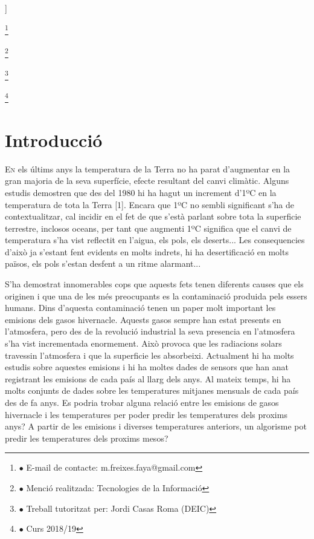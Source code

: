 \documentclass[10pt,a4paper,twocolumn,twoside]{article}
\newcommand\blfootnote[1]{%
  \begingroup
  \renewcommand\thefootnote{}\footnote{#1}%
  \addtocounter{footnote}{-1}%
  \endgroup
}
\begin{document}
\begin{@twocolumnfalse}
\begin{center}
\bigskip

{\vrule depth 0pt height 0.5pt width 4cm\hspace{7.5pt}%
%
\hspace{7.5pt}\vrule depth 0pt height 0.5pt width 4cm\relax}

\end{center}

\bigskip
\end{@twocolumnfalse}]

\blfootnote{$\bullet$ E-mail de contacte: m.freixes.faya@gmail.com}
\blfootnote{$\bullet$ Menció realitzada: Tecnologies de la Informació}
\blfootnote{$\bullet$ Treball tutoritzat per: Jordi Casas Roma (DEIC)}
\blfootnote{$\bullet$ Curs 2018/19}
\section{Introducció}
\lettrine[lines=3]{E}{n} els últims anys la temperatura de la Terra no ha parat d'augmentar en la gran majoria de la seva superfície, efecte resultant del canvi climàtic. Alguns estudis demostren que des del 1980 hi ha hagut un increment d'1ºC en la temperatura de tota la Terra [1]. Encara que 1ºC no sembli significant s'ha de contextualitzar, cal incidir en el fet de que s'està parlant sobre tota la superficie terrestre, inclosos oceans, per tant que augmenti 1ºC significa que el canvi de temperatura s'ha vist reflectit en l'aigua, els pols, els deserts... Les consequencies d'això ja s'estant fent evidents en molts indrets, hi ha desertificació en molts països, els pols s'estan desfent a un ritme alarmant... 

S'ha demostrat innomerables cops que aquests fets tenen diferents causes que els originen i que una de les més preocupants es la contaminació produida pels essers humans. Dins d'aquesta contaminació tenen un paper molt important les emisions dels gasos hivernacle. Aquests gasos sempre han estat presents en l'atmosfera, pero des de la revolució industrial la seva presencia en l'atmosfera s'ha vist incrementada enormement. Això provoca que les radiacions solars travessin l'atmosfera i que la superficie les absorbeixi. Actualment hi ha molts estudis sobre aquestes emisions i hi ha moltes dades de sensors que han anat registrant les emisions de cada país al llarg dels anys. Al mateix temps, hi ha molts conjunts de dades sobre les temperatures mitjanes mensuals de cada país des de fa anys. Es podria trobar alguna relació entre les emisions de gasos hivernacle i les temperatures per poder predir les temperatures dels proxims anys? A partir de les emisions i diverses temperatures anteriors, un algorisme pot predir les temperatures dels proxims mesos?
\end{document}
